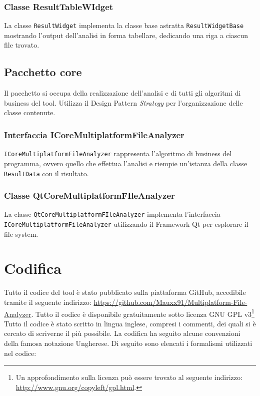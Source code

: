		\subsubsection{Classe ResultTableWIdget}
			La classe \texttt{ResultWidget} implementa la classe base astratta \texttt{ResultWidgetBase} mostrando l'output dell'analisi in forma tabellare, dedicando una riga a ciascun file trovato.
			
	\subsection{Pacchetto core}
		Il pacchetto si occupa della realizzazione dell'analisi e di tutti gli algoritmi di business del tool. Utilizza il Design Pattern \textit{Strategy} per l'organizzazione delle classe contenute.
		
		\subsubsection{Interfaccia ICoreMultiplatformFileAnalyzer}
			\texttt{ICoreMultiplatformFileAnalyzer} rappresenta l'algoritmo di business del programma, ovvero quello che effettua l'analisi e riempie un'istanza della classe \texttt{ResultData} con il risultato.
			
		\subsubsection{Classe QtCoreMultiplatformFIleAnalyzer}
			La classe \texttt{QtCoreMultiplatformFIleAnalyzer} implementa l'interfaccia\\ \texttt{ICoreMultiplatformFileAnalyzer} utilizzando il Framework Qt per esplorare il file system.
			
\section{Codifica}
	Tutto il codice del tool è stato pubblicato sulla piattaforma GitHub, accedibile tramite il seguente indirizzo: \url{https://github.com/Mauxx91/Multiplatform-File-Analyzer}. Tutto il codice è disponibile gratuitamente sotto licenza GNU GPL v3\footnote{Un approfondimento sulla licenza può essere trovato al seguente indirizzo: \url{http://www.gnu.org/copyleft/gpl.html}.}\\

	Tutto il codice è stato scritto in lingua inglese, compresi i commenti, dei quali si è cercato di scriverne il più possibile.
	La codifica ha seguito alcune convenzioni della famosa notazione Ungherese. Di seguito sono elencati i formalismi utilizzati nel codice:
	
